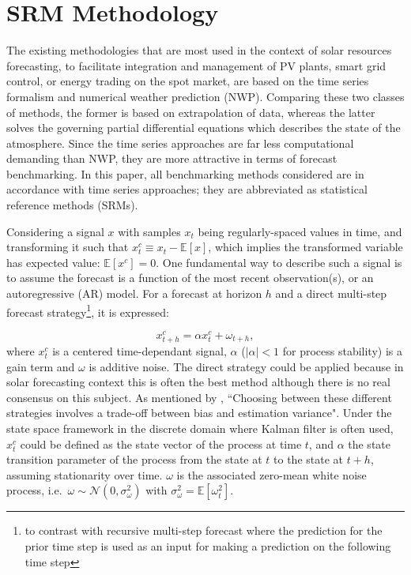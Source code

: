 \section{SRM Methodology}
\label{sec:2}

The existing methodologies that are most used in the context of solar resources forecasting, to facilitate integration and management of PV plants, smart grid control, or energy trading on the spot market, are based on the time series formalism and numerical weather prediction (NWP). Comparing these two classes of methods, the former is based on extrapolation of data, whereas the latter solves the governing partial differential equations which describes the state of the atmosphere. Since the time series approaches are far less computational demanding than NWP, they are more attractive in terms of forecast benchmarking. In this paper, all benchmarking methods considered are in accordance with time series approaches; they are abbreviated as statistical reference methods (SRMs).

Considering a signal $x$ with samples $x_t$ being regularly-spaced values in time, and transforming it such that $x^c_t\equiv x_t-\mathbb{E}[x]$, which implies the transformed variable has expected value: $\mathbb{E}[x^c]=0$. One fundamental way to describe such a signal is to assume the forecast is a function of the most recent observation(s), or an autoregressive (AR) model. For a forecast at horizon $h$ and a direct multi-step forecast strategy\footnote{to contrast with recursive multi-step forecast \citep{Bontempi2013} where the prediction for the prior time step is used as an input for making a prediction on the following time step}, it is expressed:

\begin{equation}
\label{eq:eq1}
{x}_{t+h}^c=\alpha x^c_t+\omega_{t+h},
\end{equation}
where $x^c_t$ is a centered time-dependant signal, $\alpha$ ($\vert \alpha \vert<1$ for process stability) is a gain term and $\omega$ is additive noise. The direct strategy could be applied because in solar forecasting context this is often the best method although there is no real consensus on this subject. As mentioned by \citet {Taieb2012RecursiveAD}, ``Choosing between these different strategies involves a trade-off between bias and estimation variance". Under the state space framework in the discrete domain where Kalman filter is often used, $x^c_t$ could be defined as the state vector of the process at time $t$, and $\alpha$ the state transition parameter of the process from the state at $t$ to the state at $t+h$, assuming stationarity over time. $\omega$ is the associated zero-mean white noise process, i.e.\, $\omega\sim \mathcal{N}(0, \sigma^2_{\omega})$ with $\sigma^2_{\omega}=\mathbb{E}[\omega_t^2]$. 

